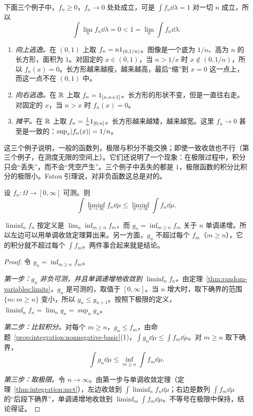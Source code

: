 \begin{example}[质量的三种逃逸方式]\label{ex:integration:escape}
下面三个例子中，$f_n\geqslant0$，$f_n\to0$ 处处成立，可是 $\int f_n\dd\lambda=1$ 对一切 $n$ 成立，所以
\[
\int\lim_nf_n\dd\lambda=0<1=\lim_n\int f_n\dd\lambda .
\]
\begin{enumerate}
\item \emph{向上逃逸。}在 $(0,1)$ 上取 $f_n=n1_{(0,1/n)}$。图像是一个底为 $1/n$、高为 $n$ 的长方形，面积为 $1$。对固定的 $x\in(0,1)$，当 $n>1/x$ 时 $x\notin(0,1/n)$，所以 $f_n(x)=0$。长方形越来越瘦，越来越高，最后“缩”到 $x=0$ 这一点上，而这一点不在 $(0,1)$ 中。
\item \emph{向右逃逸。}在 $\mathbb{R}$ 上取 $f_n=1_{[n,n+1]}$。长方形的形状不变，但是一直往右走。对固定的 $x$，当 $n>x$ 时 $f_n(x)=0$。
\item \emph{摊平。}在 $\mathbb{R}$ 上取 $f_n=\frac1n1_{[0,n]}$。长方形越来越矮，越来越宽。这里 $f_n\to0$ 甚至是一致的：$\sup_x\lvert f_n(x)\rvert=1/n$。
\end{enumerate}
这三个例子说明，一般的函数列，极限与积分不能交换；即使一致收敛也不行（第三个例子，在测度无限的空间上）。它们还说明了一个现象：在极限过程中，积分只会“丢失”，而不会“凭空产生”。三个例子中丢失的都是 $1$，极限函数的积分比积分的极限小。Fatou 引理说，对非负函数这总是对的。
\end{example}

\begin{theorem}[Fatou 引理]\label{thm:integration:fatou}
设 $f_n:\Omega\to[0,\infty]$ 可测。则
\[
\int\liminf_{n\to\infty}f_n\dd\mu\leqslant\liminf_{n\to\infty}\int f_n\dd\mu .
\]
\end{theorem}

\begin{remark}[证明思路]
$\liminf_nf_n$ 按定义是 $\lim_n\inf_{m\geqslant n}f_m$，而 $g_n=\inf_{m\geqslant n}f_m$ 关于 $n$ 单调递增。所以左边可以用单调收敛定理算出来。另一方面，$g_n$ 不超过每个 $f_m$（$m\geqslant n$），它的积分就不超过每个 $\int f_m$。两件事合起来就是结论。
\end{remark}

\begin{proof}
令 $g_n=\inf_{m\geqslant n}f_m$。

\emph{第一步：$g_n$ 非负可测，并且单调递增地收敛到 $\liminf_nf_n$。}由定理~\ref{thm:random-variables:limits}，$g_n$ 是可测的，取值于 $[0,\infty]$。当 $n$ 增大时，取下确界的范围 $\{m:m\geqslant n\}$ 变小，所以 $g_n\leqslant g_{n+1}$。按照下极限的定义，$\liminf_nf_n=\lim_ng_n=\sup_ng_n$。

\emph{第二步：比较积分。}对每个 $m\geqslant n$，$g_n\leqslant f_m$，由命题~\ref{prop:integration:nonnegative-basic}(1)，$\int g_n\dd\mu\leqslant\int f_m\dd\mu$。对 $m\geqslant n$ 取下确界，
\[
\int g_n\dd\mu\leqslant\inf_{m\geqslant n}\int f_m\dd\mu .
\]

\emph{第三步：取极限。}令 $n\to\infty$。由第一步与单调收敛定理（定理~\ref{thm:integration:mct}），左边收敛到 $\int\liminf_nf_n\dd\mu$；右边是数列 $\int f_m\dd\mu$ 的“后段下确界”，单调递增地收敛到 $\liminf_m\int f_m\dd\mu$。不等号在极限中保持，结论得证。
\end{proof}

